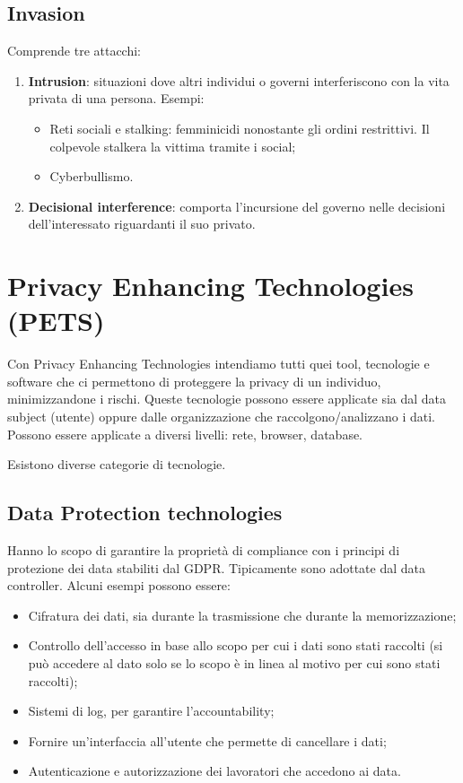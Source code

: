 \subsection{Invasion}
Comprende tre attacchi:
\begin{enumerate}
    \item \textbf{Intrusion}: situazioni dove altri individui o governi interferiscono con la vita privata di una persona.  Esempi:
    \begin{itemize}
        \item Reti sociali e stalking: femminicidi nonostante gli ordini restrittivi. Il colpevole stalkera la vittima tramite i social;
        \item Cyberbullismo.
    \end{itemize}
    \item \textbf{Decisional interference}: comporta l'incursione del governo nelle decisioni dell'interessato riguardanti il suo privato.
\end{enumerate}

\section{Privacy Enhancing Technologies (PETS)}
Con Privacy Enhancing Technologies intendiamo tutti quei tool, tecnologie e software che ci permettono di proteggere la privacy di un individuo, minimizzandone i rischi. Queste tecnologie possono essere applicate sia dal data subject (utente) oppure dalle organizzazione che raccolgono/analizzano i dati. Possono essere applicate a diversi livelli: rete, browser, database. 

Esistono diverse categorie di tecnologie.

\subsection{Data Protection technologies}
Hanno lo scopo di garantire la proprietà di compliance con i principi di protezione dei data stabiliti dal GDPR. Tipicamente sono adottate dal data controller. Alcuni esempi possono essere:
\begin{itemize}
    \item Cifratura dei dati, sia durante la trasmissione che durante la memorizzazione;
    \item Controllo dell'accesso in base allo scopo per cui i dati sono stati raccolti (si può accedere al dato solo se lo scopo è in linea al motivo per cui sono stati raccolti);
    \item Sistemi di log, per garantire l'accountability;
    \item Fornire un'interfaccia all'utente che permette di cancellare i dati;
    \item Autenticazione e autorizzazione dei lavoratori che accedono ai data.
\end{itemize}

